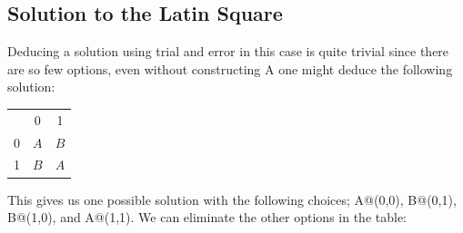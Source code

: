 \documentclass{article}
\begin{document}
\subsection{Solution to the Latin Square}
Deducing a solution using trial and error in this case is quite trivial since there are so few options, even without constructing A one might deduce the following solution:\\
\begin{center}
\begin{tabular}{ccc}
 & 0 & 1 \\ \cline{2-3} 
\multicolumn{1}{c|}{0} & \multicolumn{1}{c|}{$A$} & \multicolumn{1}{c|}{$B$} \\ \cline{2-3} 
\multicolumn{1}{c|}{1} & \multicolumn{1}{c|}{$B$} & \multicolumn{1}{c|}{$A$} \\ \cline{2-3} 
\end{tabular}
\end{center}
This gives us one possible solution with the following choices; A@(0,0), B@(0,1), B@(1,0), and A@(1,1). We can eliminate the other options in the table:\\
\renewcommand{\arraystretch}{2.5}
\end{document}

